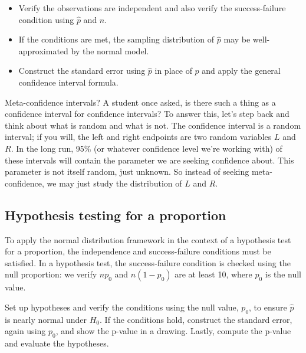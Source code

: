 \begin{termBox}{\vspace{-1mm}
\begin{itemize}
\setlength{\itemsep}{0mm}
\item Verify the observations are independent and also verify the success-failure condition using $\hat{p}$ and $n$.
\item If the conditions are met, the sampling distribution of $\hat{p}$ may be well-approximated by the normal model.
\item Construct the standard error using $\hat{p}$ in place of $p$ and apply the general confidence interval formula.\vspace{1mm}
\end{itemize}}
\end{termBox}


\begin{example}{Meta-confidence intervals?}
A student once asked, is there such a thing as a confidence interval for confidence intervals?
To answer this, let's step back and think about what is random and what is not. The confidence interval is a random interval; if you will, the left and right endpoints are two random variables $L$ and $R$.
In the long run, 95\% (or whatever confidence level we're working with) of these intervals will contain the parameter we are seeking confidence about. This parameter is not itself random, just unknown.
So instead of seeking meta-confidence, we may just study the distribution of $L$ and $R$.
\end{example}

\subsection{Hypothesis testing for a proportion}
	\label{htForPropSection}

	To apply the normal distribution framework in the context of a hypothesis test for a proportion, the independence and success-failure conditions must be satisfied. In a hypothesis test, the success-failure condition is checked using the null proportion: we verify $np_0$ and $n(1-p_0)$ are at least 10, where $p_0$ is the null value.

	\begin{termBox}{
	Set up hypotheses and verify the conditions using the null value, $p_0$, to ensure $\hat{p}$ is nearly normal under $H_0$. If the conditions hold, construct the standard error, again using $p_0$, and show the p-value in a drawing. Lastly, compute the p-value and evaluate the hypotheses.}
	\end{termBox}


